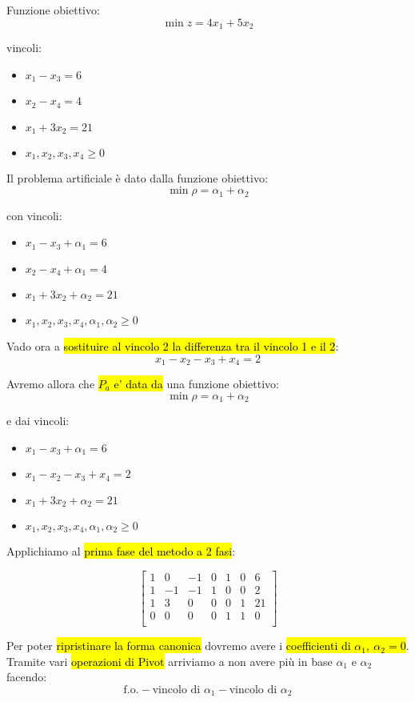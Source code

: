 Funzione obiettivo:
$$\min z = 4x_1 + 5x_2$$

vincoli:

\begin{itemize}
	\item $x_1 - x_3 = 6$
	\item $x_2 - x_4 = 4$
	\item $x_1 + 3x_2 = 21$
	\item $x_1, x_2, x_3, x_4 \geq 0$
\end{itemize}

Il problema artificiale è dato dalla funzione obiettivo:
$$\min \rho = \alpha_1 + \alpha_2$$

con vincoli:

\begin{itemize}
	\item $x_1 - x_3 + \alpha_1 = 6$
	\item $x_2 - x_4 + \alpha_1 = 4$
	\item $x_1 + 3x_2 + \alpha_2 = 21$
	\item $x_1, x_2, x_3, x_4, \alpha_1, \alpha_2 \geq 0$
\end{itemize}

Vado ora a \hl{sostituire al vincolo 2 la differenza tra il vincolo 1 e il 2}:
$$x_1 - x_2 - x_3 + x_4 = 2$$

Avremo allora che \hl{$P_a$ e' data da} una funzione obiettivo:
$$\min \rho = \alpha_1 + \alpha_2$$

e dai vincoli:

\begin{itemize}
	\item $x_1 - x_3 + \alpha_1 = 6$
	\item $x_1 - x_2 -x_3 + x_4 = 2$
	\item $x_1 + 3x_2 + \alpha_2 = 21$
	\item $x_1, x_2, x_3, x_4, \alpha_1, \alpha_2 \geq 0$
\end{itemize}

Applichiamo al \hl{prima fase del metodo a 2 fasi}:


$$
\left[ {\begin{array}{ccccccc}
	1 & 0 & -1 & 0 & 1 & 0 & 6\\
	1 & -1 & -1 & 1 & 0 & 0 & 2\\
	1 & 3 & 0 & 0 & 0 & 1 & 21\\
	0 & 0 & 0 & 0 & 1 & 1 & 0\\
\end{array} } \right]
$$

Per poter \hl{ripristinare la forma canonica} dovremo avere i \hl{coefficienti di $\alpha_1,\ \alpha_2 = 0$}. Tramite vari \hl{operazioni di Pivot} arriviamo a non avere più in base $\alpha_1$ e $\alpha_2$ facendo:
$$\text{f.o.} - \text{vincolo di }\alpha_1 - \text{vincolo di }\alpha_2$$

